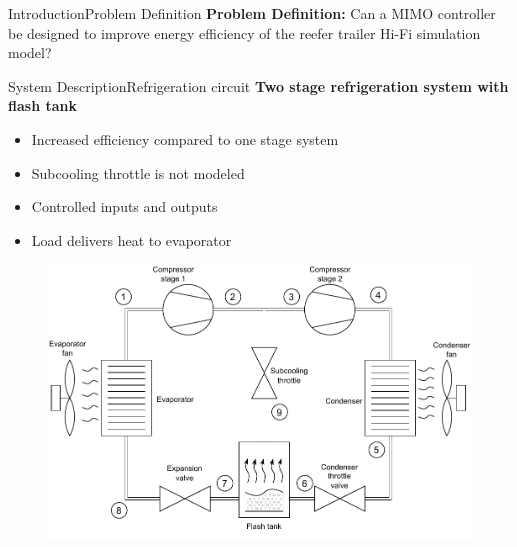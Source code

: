 \begin{frame}{Introduction}{Problem Definition}
	\textbf{Problem Definition:} Can a MIMO controller be designed to improve energy efficiency of the reefer trailer Hi-Fi simulation model?
\end{frame}

\begin{frame}{System Description}{Refrigeration circuit}
	\textbf{Two stage refrigeration system with flash tank}
	\begin{itemize}
		\item Increased efficiency compared to one stage system 
		\item Subcooling throttle is not modeled
		\item Controlled inputs and outputs
		\item Load delivers heat to evaporator
	\end{itemize}
\begin{figure}[h]
	\centering
	\begin{minipage}{0.6\textwidth}
		\centering
		\includegraphics[width=1\textwidth]{../Graphics/HVAC_Diagram_Fans.pdf} %
	\end{minipage}\hfill
	\begin{minipage}{0.4\textwidth}
		\centering

\end{minipage}
\end{figure}
\end{frame}
